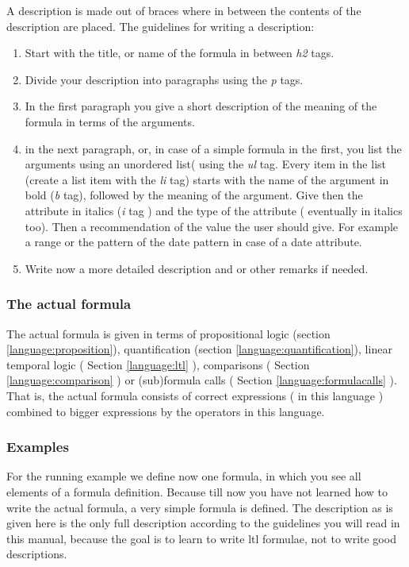 A description is made out of braces where in between the contents of the
description are placed. The guidelines for writing a description:\\
\begin{enumerate}
    \item Start with the title, or name of the formula in between \textit{h2}
    tags.
    \item Divide your description into paragraphs using the \textit{p} tags.
    \item In the first paragraph you give a short description of the meaning
    of the formula in terms of the arguments.
    \item in the next paragraph, or, in case of a simple formula in the first,
    you list the arguments using an unordered list( using the \textit{ul} tag.
    Every item in the list (create a list item with the \textit{li} tag)
    starts with the name of the argument in bold (\textit{b} tag), followed by
    the meaning of the argument. Give then the attribute in italics
    (\textit{i} tag ) and the type of the attribute ( eventually in italics
    too). Then a recommendation of
    the value the user should give. For example a range or the pattern of the
    date pattern in case of a date attribute.
    \item Write now a more detailed description and or other remarks if
    needed.
\end{enumerate}

\subsubsection{The actual formula}

The actual formula is given in terms of propositional logic (section
\ref{language:proposition}), quantification (section
\ref{language:quantification}),
linear temporal logic ( Section \ref{language:ltl} ), comparisons ( Section
\ref{language:comparison} )  or (sub)formula calls ( Section
\ref{language:formulacalls} ). That is, the actual formula consists of correct
expressions ( in this language ) combined to bigger expressions by the operators in
this language.

\subsubsection{Examples}

For the running example we define now one formula, in which you see all
elements of a formula definition. Because till now you have not learned how to
write the actual formula, a very simple formula is defined. The description as
is given here is the only full description according to the guidelines you
will read in this manual, because the goal is to learn to write ltl formulae,
not to write good descriptions.

